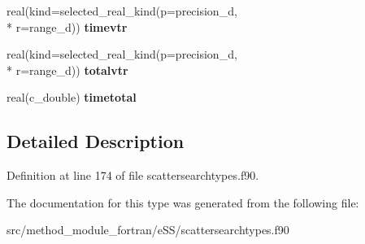 \begin{DoxyCompactItemize}
\item 
\hypertarget{structscattersearchtypes_1_1resultsf_a0f4aabf007c89ff3ff069dd7962c2612}{real(kind=selected\-\_\-real\-\_\-kind(p=precision\-\_\-d, \\*
r=range\-\_\-d)) {\bfseries timevtr}}\label{structscattersearchtypes_1_1resultsf_a0f4aabf007c89ff3ff069dd7962c2612}

\item 
\hypertarget{structscattersearchtypes_1_1resultsf_a802c4cf9c114699b622a8abcdca02ead}{real(kind=selected\-\_\-real\-\_\-kind(p=precision\-\_\-d, \\*
r=range\-\_\-d)) {\bfseries totalvtr}}\label{structscattersearchtypes_1_1resultsf_a802c4cf9c114699b622a8abcdca02ead}

\item 
\hypertarget{structscattersearchtypes_1_1resultsf_abac1b17b5379a2650b4468a2f5af13f5}{real(c\-\_\-double) {\bfseries timetotal}}\label{structscattersearchtypes_1_1resultsf_abac1b17b5379a2650b4468a2f5af13f5}

\end{DoxyCompactItemize}


\subsection{Detailed Description}


Definition at line 174 of file scattersearchtypes.\-f90.



The documentation for this type was generated from the following file\-:\begin{DoxyCompactItemize}
\item 
src/method\-\_\-module\-\_\-fortran/e\-S\-S/scattersearchtypes.\-f90\end{DoxyCompactItemize}
